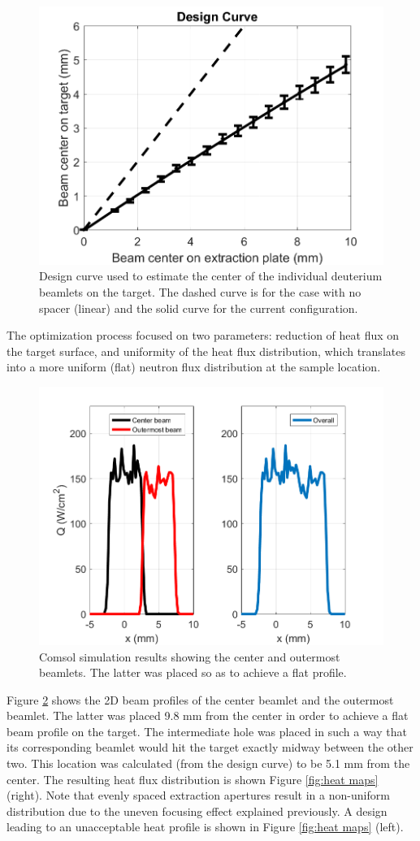 \documentclass[review]{elsarticle}
\begin{document}
\begin{figure}
	\centering
	\includegraphics[height=0.5\textwidth]{pics/designC}
	\caption{Design curve used to estimate the center of the individual deuterium beamlets on the target. The dashed curve is for the case with no spacer (linear) and the solid curve for the current configuration.}
	\label{fig:designC}
\end{figure}

The optimization process focused on two parameters: reduction of heat flux on the target surface, and uniformity of the heat flux distribution, which translates into a more uniform (flat) neutron flux distribution at the sample location.

\begin{figure}
	\centering
	\includegraphics[height=0.5\textwidth]{pics/twoBeams}
	\caption{Comsol simulation results showing the center and outermost beamlets. The latter was placed so as to achieve a flat profile.}
	\label{fig:two_beams}
\end{figure}

Figure \ref{fig:two_beams} shows the 2D beam profiles of the center beamlet and the outermost beamlet. The latter was placed 9.8 mm from the center in order to achieve a flat beam profile on the target. The intermediate hole was placed in such a way that its corresponding beamlet would hit the target exactly midway between the other two. This location was calculated (from the design curve) to be 5.1 mm from the center. The resulting heat flux distribution is shown Figure \ref{fig:heat maps} (right). Note that evenly spaced extraction apertures result in a non-uniform distribution due to the uneven focusing effect explained previously. A design leading to an unacceptable heat profile is shown in Figure \ref{fig:heat maps} (left). 
\end{document}
